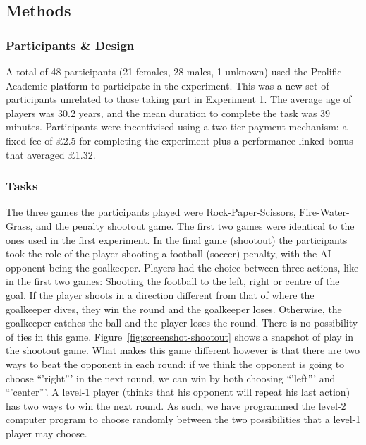 \documentclass[man,floatsintext]{apa6}
\begin{document}
\hypertarget{methods-1}{%
\subsection{Methods}\label{methods-1}}

\hypertarget{participants-design}{%
\subsubsection{Participants \& Design}\label{participants-design}}

A total of 48 participants (21 females, 28 males, 1 unknown) used the Prolific Academic platform to participate in the experiment. This was a new set of participants unrelated to those taking part in Experiment 1. The average age of players was 30.2 years, and the mean duration to complete the task was 39 minutes. Participants were incentivised using a two-tier payment mechanism: a fixed fee of £2.5 for completing the experiment plus a performance linked bonus that averaged £1.32.

\hypertarget{tasks-1}{%
\subsubsection{Tasks}\label{tasks-1}}

The three games the participants played were Rock-Paper-Scissors, Fire-Water-Grass, and the penalty shootout game. The first two games were identical to the ones used in the first experiment. In the final game (shootout) the participants took the role of the player shooting a football (soccer) penalty, with the AI opponent being the goalkeeper. Players had the choice between three actions, like in the first two games: Shooting the football to the left, right or centre of the goal. If the player shoots in a direction different from that of where the goalkeeper dives, they win the round and the goalkeeper loses. Otherwise, the goalkeeper catches the ball and the player loses the round. There is no possibility of ties in this game. Figure~\ref{fig:screenshot-shootout} shows a snapshot of play in the shootout game. What makes this game different however is that there are two ways to beat the opponent in each round: if we think the opponent is going to choose \enquote{'right}' in the next round, we can win by both choosing \enquote{'left}' and \enquote{'center}'. A level-1 player (thinks that his opponent will repeat his last action) has two ways to win the next round. As such, we have programmed the level-2 computer program to choose randomly between the two possibilities that a level-1 player may choose.
\end{document}
